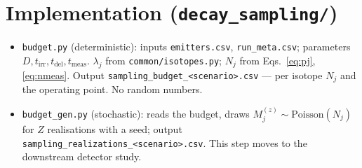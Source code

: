 \documentclass[11pt]{article}
\newcommand{\tirr}{t_{\mathrm{irr}}}
\newcommand{\tdel}{t_{\mathrm{del}}}
\newcommand{\tmeas}{t_{\mathrm{meas}}}
\begin{document}
\section{Implementation (\texttt{decay\_sampling/})}

\begin{itemize}[nosep]
\item \texttt{budget.py} (deterministic): inputs \texttt{emitters.csv},
\texttt{run\_meta.csv}; parameters $D,\tirr,\tdel,\tmeas$. $\lambda_j$ from
\texttt{common/isotopes.py}; $N_j$ from Eqs.~\eqref{eq:pj},\eqref{eq:nmeas}.
Output \texttt{sampling\_budget\_<scenario>.csv} --- per isotope $N_j$ and the
operating point. No random numbers.
\item \texttt{budget\_gen.py} (stochastic): reads the budget, draws
$M_j^{(z)}\sim\mathrm{Poisson}(N_j)$ for $Z$ realisations with a seed; output
\texttt{sampling\_realizations\_<scenario>.csv}. This step moves to the
downstream detector study.
\end{itemize}
\end{document}
